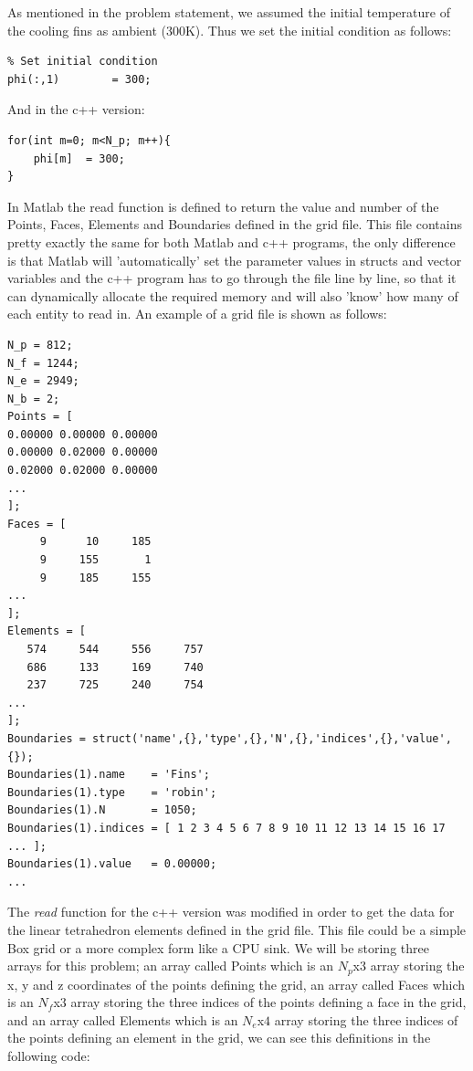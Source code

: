 \documentclass[12pt]{article}
\begin{document}
As mentioned in the problem statement, we assumed the initial temperature of the cooling fins as ambient (300K). Thus we set the initial condition as follows:

\begin{lstlisting}
% Set initial condition
phi(:,1)        = 300;
\end{lstlisting}

And in the c++ version:

\begin{lstlisting}[style=MyC++Style]
for(int m=0; m<N_p; m++){
	phi[m]	= 300;
}
\end{lstlisting}

In Matlab the read function is defined to return the value and number of the Points, Faces, Elements and Boundaries defined in the grid file. This file contains pretty exactly the same for both Matlab and c++ programs, the only difference is that Matlab will 'automatically' set the parameter values in structs and vector variables and the c++ program has to go through the file line by line, so that it can dynamically allocate the required memory and will also 'know' how many of each entity to read in. An example of a grid file is shown as follows:

\begin{lstlisting}
N_p = 812;
N_f = 1244;
N_e = 2949;
N_b = 2;
Points = [
0.00000	0.00000	0.00000
0.00000	0.02000	0.00000
0.02000	0.02000	0.00000
...
];
Faces = [
     9	    10	   185
     9	   155	     1
     9	   185	   155
...
];
Elements = [
   574	   544	   556	   757
   686	   133	   169	   740
   237	   725	   240	   754
...
];
Boundaries = struct('name',{},'type',{},'N',{},'indices',{},'value',{});
Boundaries(1).name    = 'Fins';
Boundaries(1).type    = 'robin';
Boundaries(1).N       = 1050;
Boundaries(1).indices = [ 1 2 3 4 5 6 7 8 9 10 11 12 13 14 15 16 17 ... ];
Boundaries(1).value   = 0.00000;
...
\end{lstlisting}

The \textit{read} function for the c++ version was modified in order to get the data for the linear tetrahedron elements defined in the grid file. This file could be a simple Box grid or a more complex form like a CPU sink. We will be storing three arrays for this problem; an array called Points which is an $N_p$x$3$ array storing the x, y and z coordinates of the points defining the grid, an array called Faces which is an $N_f$x$3$ array storing the three indices of the points defining a face in the grid, and an array called Elements which is an $N_e$x$4$ array storing the three indices of the points defining an element in the grid, we can see this definitions in the following code:
\end{document}
